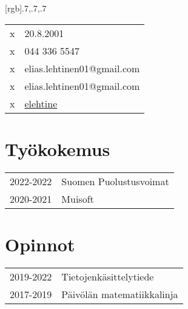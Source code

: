 \documentclass{cv}
\begin{document}
[rgb]{.7,.7,.7}


\begin{paracol}{2}


  \sidesep

  \begin{tabular}{cl}
    x & 20.8.2001 \\
    x & 044 336 5547 \\
    x & elias.lehtinen01@gmail.com \\
    x & elias.lehtinen01@gmail.com \\
    x & \href{https://www.github.com/elehtine}{elehtine} \\
  \end{tabular}

  \sidesep


  \switchcolumn




  \section*{Työkokemus}
  \begin{tabular}{r|l}
    2022-2022 & Suomen Puolustusvoimat \\
    2020-2021 & Muisoft \\
  \end{tabular}

  \section*{Opinnot}
  \begin{tabular}{r|l}
    2019-2022 & Tietojenkäsittelytiede \\
    2017-2019 & Päivölän matematiikkalinja \\
  \end{tabular}
\end{paracol}
\end{document}
